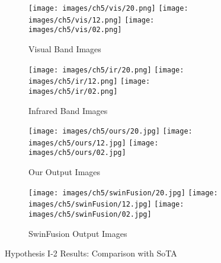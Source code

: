 \begin{figure}[htbp]
    \centering
    \begin{subfigure}[b]{\textwidth}
        \texttt{[image: images/ch5/vis/20.png]}
        \texttt{[image: images/ch5/vis/12.png]}
        \texttt{[image: images/ch5/vis/02.png]}
        \caption{Visual Band Images}
        \label{fig:ch5:met9:vis}
    \end{subfigure}
    \vspace{0.01cm}
    \begin{subfigure}[b]{\textwidth}
        \texttt{[image: images/ch5/ir/20.png]}
        \texttt{[image: images/ch5/ir/12.png]}
        \texttt{[image: images/ch5/ir/02.png]}
        \caption{Infrared Band Images}
        \label{fig:ch5:met9:ir}
    \end{subfigure}
    \vspace{0.01cm}
    \begin{subfigure}[b]{\textwidth}
        \texttt{[image: images/ch5/ours/20.jpg]}
        \texttt{[image: images/ch5/ours/12.jpg]}
        \texttt{[image: images/ch5/ours/02.jpg]}
        \caption{Our Output Images}
        \label{fig:ch5:met9:ours}
    \end{subfigure}
    \vspace{0.01cm}
    \begin{subfigure}[b]{\textwidth}
        \texttt{[image: images/ch5/swinFusion/20.jpg]}
        \texttt{[image: images/ch5/swinFusion/12.jpg]}
        \texttt{[image: images/ch5/swinFusion/02.jpg]}
        \caption{SwinFusion\cite{ma2022swinfusion} Output Images}
        \label{fig:ch5:met9:swin}
    \end{subfigure}
    \caption{Hypothesis I-2 Results: Comparison with SoTA}
    \label{fig:ch5:met4}
\end{figure}

